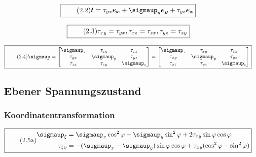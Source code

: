 \documentclass[11pt]{article}
\newcommand{\1}{ {\mathds{1}} }
\renewcommand{\sigma  }{\sigmaup   }
\begin{document}
		\begin{equation}
			\boxed{
				\tag{2.2}
				\begin{split}
					\boldsymbol{t}
					=
					\tau_{yx} \boldsymbol{e_x}
					+
					\sigma_y	\boldsymbol{e_y}
					+
					\tau_{yz} \boldsymbol{e_z}
				\end{split}
			}
		\end{equation}

		\begin{equation}
			\boxed{
				\tag{2.3}
				\begin{split}
					\tau_{xy} = \tau_{yx},
					\tau_{xz} = \tau_{zx},
					\tau_{yz} = \tau_{zy}
				\end{split}
			}
		\end{equation}
		
		\begin{equation}
			\boxed{
				\tag{2.4}
				\begin{split}
					\boldsymbol{\sigma}
					=
					\begin{bmatrix*}
						\sigma_{x} & \tau_{xy}	& \tau_{xz} \\
						\tau_{yx}	& \sigma_{y} & \tau_{yz} \\
						\tau_{zx}	& \tau_{zy}	& \sigma_{z}
					\end{bmatrix*}
					=
					\begin{bmatrix*}
						\sigma_{x} & \tau_{xy}	& \tau_{xz} \\
						\tau_{xy}	& \sigma_{y} & \tau_{yz} \\
						\tau_{xz}	& \tau_{yz}	& \sigma_{z}
					\end{bmatrix*}					
				\end{split}
			}
		\end{equation}

		\subsection{Ebener Spannungszustand}
		
		\subsubsection{Koordinatentransformation}

		\begin{equation}
			\boxed{
				\tag{2.5a}
				\begin{split}
					\sigma_{\xi} &= \sigma_x \cos^2 \varphi + \sigma_y \sin^2\varphi + 2 \tau_{xy} \sin\varphi \cos\varphi\\
					\tau_{\xi \eta} &= -(\sigma_x - \sigma_y) \sin \varphi \cos \varphi + \tau_{xy} (\cos^2\varphi - \sin^2\varphi)
				\end{split}
			}
		\end{equation}
	 
\end{document}
